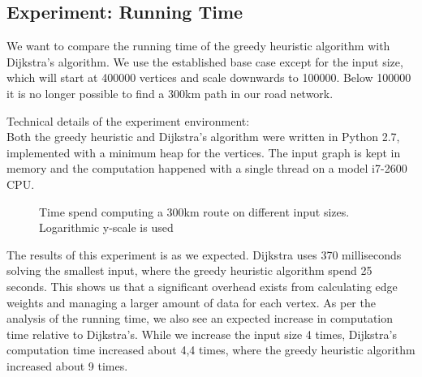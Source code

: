 \subsection{Experiment: Running Time}
We want to compare the running time of the greedy heuristic algorithm with Dijkstra's algorithm. We use the established base case except for the input size, which will start at 400000 vertices and scale downwards to 100000. Below 100000 it is no longer possible to find a 300km path in our road network.

Technical details of the experiment environment:\\
Both the greedy heuristic and Dijkstra's algorithm were written in Python 2.7, implemented with a minimum heap for the vertices. The input graph is kept in memory and the computation happened with a single thread on a model i7-2600 CPU.
\begin{figure}[!htb]
\centering
{}
\caption{Time spend computing a 300km route on different input sizes. Logarithmic y-scale is used} 
\label{fig:time_comp}
\end{figure}

The results of this experiment is as we expected. Dijkstra uses 370 milliseconds solving the smallest input, where the greedy heuristic algorithm spend 25 seconds. This shows us that a significant overhead exists from calculating edge weights and managing a larger amount of data for each vertex. As per the analysis of the running time, we also see an expected increase in computation time relative to Dijkstra's. While we increase the input size 4 times, Dijkstra's computation time increased about 4,4 times, where the greedy heuristic algorithm increased about 9 times.